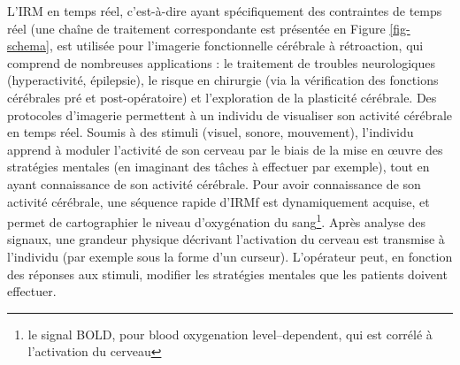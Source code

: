 L’IRM en temps réel, c’est-à-dire ayant spécifiquement des contraintes de temps réel {\color{red}(}une chaîne de traitement correspondante est présentée en Figure \ref{fig-schema}, est utilisée pour l’imagerie fonctionnelle cérébrale à rétroaction, qui comprend de nombreuses applications : le traitement de troubles neurologiques {\color{red}(}hyperactivité, épilepsie), le risque en chirurgie {\color{red}(}via la vérification des fonctions cérébrales pré et post-opératoire{\color{red})} et l’exploration de la plasticité cérébrale. Des protocoles d’imagerie permettent à un individu de visualiser son activité cérébrale en temps réel. Soumis à des stimuli {\color{red}(}visuel, sonore, mouvement{\color{red})}, l’individu apprend à moduler l’activité de son cerveau par le biais de la mise en œuvre des stratégies mentales {\color{red}(}en imaginant des tâches à effectuer par exemple{\color{red})}, tout en ayant connaissance de son activité cérébrale. Pour avoir connaissance de son activité cérébrale, une séquence rapide d’\ac{IRMf} est dynamiquement acquise, et permet de cartographier le niveau d’oxygénation du sang\footnote{le signal BOLD, pour blood oxygenation level–dependent, qui est corrélé à l’activation du cerveau}. Après analyse des signaux, une grandeur physique décrivant l’activation du cerveau est transmise à l’individu {\color{red}(}par exemple sous la forme d’un curseur). L’opérateur peut, en fonction des réponses aux stimuli, modifier les stratégies mentales que les patients doivent effectuer.
